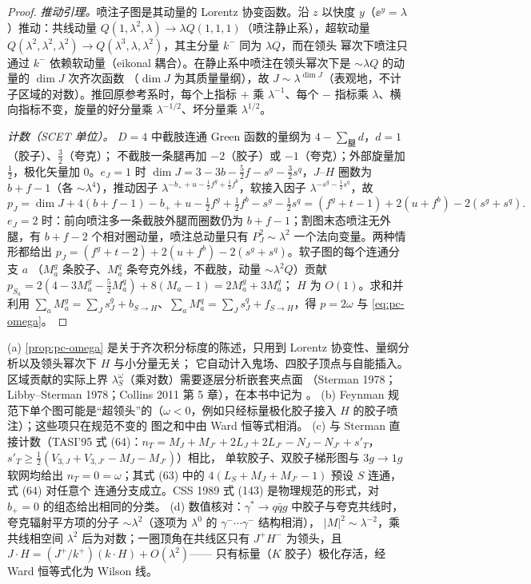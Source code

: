 \begin{proof}
\emph{推动引理。}喷注子图是其动量的 Lorentz 协变函数。沿 $z$ 以快度 $y$（$\ee^{y}=\lambda$）推动：共线动量
$Q(1,\lambda^2,\lambda)\to\lambda Q(1,1,1)$（喷注静止系），超软动量 $Q(\lambda^2,\lambda^2,\lambda^2)\to Q(\lambda^3,\lambda,\lambda^2)$，其主分量 $k^-$ 同为 $\lambda Q$，而在领头
幂次下喷注只通过 $k^-$ 依赖软动量（eikonal 耦合）。在静止系中喷注在领头幂次下是 $\sim\lambda Q$ 的动量的 $\dim J$ 次齐次函数
（$\dim J$ 为其质量量纲），故 $J\sim\lambda^{\dim J}$（表观地，不计子区域的对数）。推回原参考系时，每个上指标 $+$ 乘 $\lambda^{-1}$、每个 $-$
指标乘 $\lambda$、横向指标不变，旋量的好分量乘 $\lambda^{-1/2}$、坏分量乘 $\lambda^{1/2}$。

\emph{计数（SCET 单位）。} $D=4$ 中截肢连通 Green 函数的量纲为 $4-\sum_{\text{腿}}d$，$d=1$（胶子）、$\tfrac32$（夸克）；
不截肢一条腿再加 $-2$（胶子）或 $-1$（夸克）；外部旋量加 $\tfrac12$，极化矢量加 $0$。$e_J=1$ 时
$\dim J=3-3b-\tfrac52f-s^g-\tfrac32s^q$，$J$–$H$ 圈数为 $b+f-1$（各 $\sim\lambda^4$），推动因子
$\lambda^{-b_++u-\frac12f^g+\frac12f^b}$，软接入因子 $\lambda^{-s^g-\frac12s^q}$，故
\[
p_J=\dim J+4(b+f-1)-b_++u-\tfrac12f^g+\tfrac12f^b-s^g-\tfrac12s^q=(f^g+t-1)+2(u+f^b)-2(s^g+s^q).
\]
$e_J=2$ 时：前向喷注多一条截肢外腿而圈数仍为 $b+f-1$；割图末态喷注无外腿，有 $b+f-2$ 个相对圈动量，喷注总动量只有
$P_J^2\sim\lambda^2$ 一个法向变量。两种情形都给出 $p_J=(f^g+t-2)+2(u+f^b)-2(s^g+s^q)$。软子图的每个连通分支 $a$
（$M_a^g$ 条胶子、$M_a^q$ 条夸克外线，不截肢，动量 $\sim\lambda^2Q$）贡献 $p_{S_a}=2(4-3M_a^g-\tfrac52M_a^q)+8(M_a-1)=2M_a^g+3M_a^q$；
$H$ 为 $O(1)$。求和并利用 $\sum_aM_a^g=\sum_Js^g_J+b_{S\to H}$、$\sum_aM_a^q=\sum_Js^q_J+f_{S\to H}$，得 $p=2\omega$ 与 \cref{eq:pc-omega}。
\end{proof}

\begin{remark}
(a) \cref{prop:pc-omega} 是关于齐次积分标度的陈述，只用到 Lorentz 协变性、量纲分析以及领头幂次下 $H$ 与小分量无关；
它自动计入鬼场、四胶子顶点与自能插入。区域贡献的实际上界 $\lambda_S^{\omega}$（乘对数）需要逐层分析嵌套夹点面
（Sterman 1978；Libby--Sterman 1978；Collins 2011 第 5 章），在本书中记为 \tagA。
(b) Feynman 规范下单个图可能是“超领头”的（$\omega<0$，例如只经标量极化胶子接入 $H$ 的胶子喷注）；这些项只在规范不变的
图之和中由 Ward 恒等式相消。
(c) 与 Sterman 直接计数（TASI'95 式 (64)：$n_T=M_J+M_{J'}+2L_J+2L_{J'}-N_J-N_{J'}+s'_T$，$s'_T\ge\frac12(V_{3,J}+V_{3,J'}-M_J-M_{J'})$）相比，
单软胶子、双胶子梯形图与 $3g\to1g$ 软网均给出 $n_T=0=\omega$；其式 (63) 中的 $4(L_S+M_J+M_{J'}-1)$ 预设 $S$ 连通，式 (64) 对任意个
连通分支成立。CSS 1989 式 (143) 是物理规范的形式，对 $b_+=0$ 的组态给出相同的分类。
(d) 数值核对：$\gamma^*\to q\bar qg$ 中胶子与夸克共线时，夸克辐射平方项的分子 $\sim\lambda^2$（逐项为 $\lambda^0$ 的 $\gamma^-\cdots\gamma^-$ 结构相消），
$|M|^2\sim\lambda^{-2}$，乘共线相空间 $\lambda^2$ 后为对数；一圈顶角在共线区只有 $J^+H^-$ 为领头，且 $J\cdot H=(J^+/k^+)(k\cdot H)+O(\lambda^2)$——
只有标量（$K$ 胶子）极化存活，经 Ward 恒等式化为 Wilson 线。
\end{remark}

